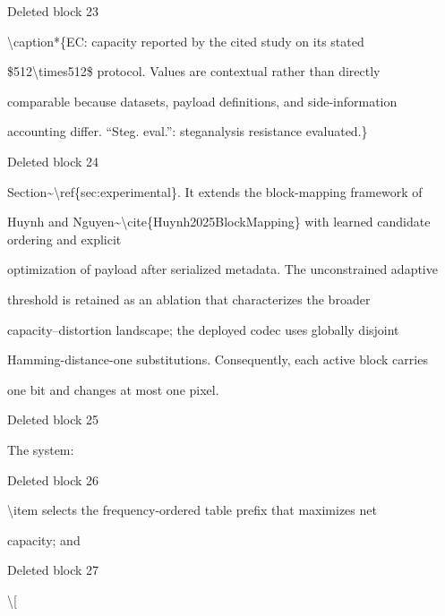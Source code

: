 \documentclass[a4paper,fleqn]{cas-dc}
\newenvironment{RevisionDeletion}{%
  \par\begingroup\color{revisionred}\footnotesize\ttfamily
  \setlength{\parindent}{0pt}\setlength{\parskip}{1pt}\obeyspaces
}{\par\endgroup}
\begin{document}
\begin{RevisionDeletion}
Deleted block 23\par
\textbackslash{}caption*\{EC: capacity reported by the cited study on its stated\par
\$512\textbackslash{}times512\$ protocol. Values are contextual rather than directly\par
comparable because datasets, payload definitions, and side-information\par
accounting differ. ``Steg. eval.'': steganalysis resistance evaluated.\}\par
\end{RevisionDeletion}

\begin{RevisionDeletion}
Deleted block 24\par
Section\textasciitilde{}\textbackslash{}ref\{sec:experimental\}. It extends the block-mapping framework of\par
Huynh and Nguyen\textasciitilde{}\textbackslash{}cite\{Huynh2025BlockMapping\} with learned candidate ordering and explicit\par
optimization of payload after serialized metadata. The unconstrained adaptive\par
threshold is retained as an ablation that characterizes the broader\par
capacity--distortion landscape; the deployed codec uses globally disjoint\par
Hamming-distance-one substitutions. Consequently, each active block carries\par
one bit and changes at most one pixel.\par
\end{RevisionDeletion}

\begin{RevisionDeletion}
Deleted block 25\par
The system:\par
\end{RevisionDeletion}

\begin{RevisionDeletion}
Deleted block 26\par
    \textbackslash{}item selects the frequency-ordered table prefix that maximizes net\par
    capacity; and\par
\end{RevisionDeletion}

\begin{RevisionDeletion}
Deleted block 27\par
\textbackslash{}[\par
\end{RevisionDeletion}
\end{document}
